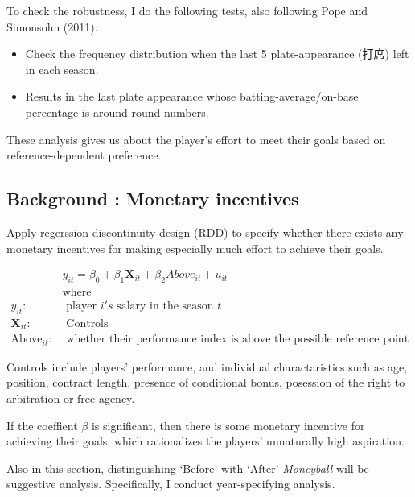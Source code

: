 \documentclass{jsarticle}[12pt]
\begin{document}
 To check the robustness, I do the following tests, also following Pope and Simonsohn (2011).
 
  \begin{itemize}
  
  \item Check the frequency distribution when the last 5 plate-appearance (打席) left in each season.
  
  \item Results in the last plate appearance whose batting-average/on-base percentage is around round numbers.
  
  \end{itemize}
 
 These analysis gives us about the player's effort to meet their goals based on reference-dependent preference.
 
 \subsection{Background : Monetary incentives}
 
 Apply regerssion discontinuity design (RDD) to specify whether there exists any monetary incentives for making especially much effort to achieve their goals.
 
  \begin{align*}
    & y_{it} = \beta_0 + \beta_1 \mathbf{X}_{it} + \beta_2 \textit{Above}_{it} + u_{it} \\
   & \text{where }  \\
   y_{it} : & \text{ player } i's \text{ salary in the season } t \\
   \mathbf{X}_{it} : & \text{ Controls} \\
   \text{Above}_{it} : & \text{ whether their performance index is above the possible reference point}
   \end{align*}
 
 Controls include players' performance, and individual charactaristics such as age, position, contract length, presence of conditional bonus, posession of the right to arbitration or free agency.
 
 If the coeffient $\beta$ is significant, then there is some monetary incentive for achieving their goals, which rationalizes the players' unnaturally high aspiration. 
 
 Also in this section, distinguishing `Before' with `After' \textit{Moneyball} will be suggestive analysis. Specifically, I conduct year-specifying analysis.
 
\end{document}
